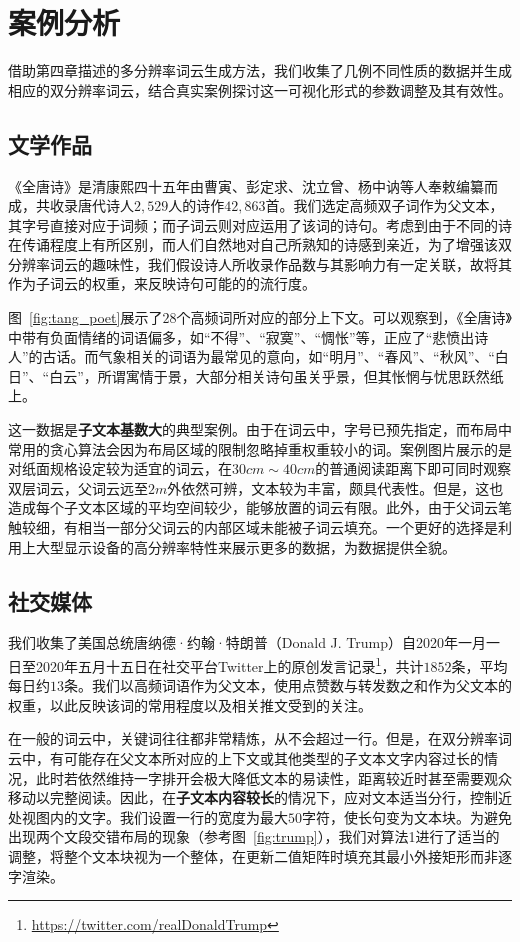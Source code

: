 \chapter{案例分析}
借助第四章描述的多分辨率词云生成方法，我们收集了几例不同性质的数据并生成相应的双分辨率词云，结合真实案例探讨这一可视化形式的参数调整及其有效性。

\section{文学作品}
《全唐诗》是清康熙四十五年由曹寅、彭定求、沈立曾、杨中讷等人奉敕编纂而成，共收录唐代诗人$2,529$人的诗作$42,863$首。我们选定高频双子词作为父文本，其字号直接对应于词频；而子词云则对应运用了该词的诗句。考虑到由于不同的诗在传诵程度上有所区别，而人们自然地对自己所熟知的诗感到亲近，为了增强该双分辨率词云的趣味性，我们假设诗人所收录作品数与其影响力有一定关联，故将其作为子词云的权重，来反映诗句可能的的流行度。

图~\ref{fig:tang_poet}展示了$28$个高频词所对应的部分上下文。可以观察到，《全唐诗》中带有负面情绪的词语偏多，如``不得''、``寂寞''、``惆怅''等，正应了``悲愤出诗人''的古话。而气象相关的词语为最常见的意向，如``明月''、``春风''、``秋风''、``白日''、``白云''，所谓寓情于景，大部分相关诗句虽关乎景，但其怅惘与忧思跃然纸上。

这一数据是\textbf{子文本基数大}的典型案例。由于在词云中，字号已预先指定，而布局中常用的贪心算法会因为布局区域的限制忽略掉重权重较小的词。案例图片展示的是对纸面规格设定较为适宜的词云，在$30cm\sim40cm$的普通阅读距离下即可同时观察双层词云，父词云远至$2m$外依然可辨，文本较为丰富，颇具代表性。但是，这也造成每个子文本区域的平均空间较少，能够放置的词云有限。此外，由于父词云笔触较细，有相当一部分父词云的内部区域未能被子词云填充。一个更好的选择是利用上大型显示设备的高分辨率特性来展示更多的数据，为数据提供全貌。


\section{社交媒体}
我们收集了美国总统唐纳德·约翰·特朗普（Donald J. Trump）自2020年一月一日至2020年五月十五日在社交平台Twitter上的原创发言记录\footnote{\url{https://twitter.com/realDonaldTrump}}，共计$1852$条，平均每日约$13$条。我们以高频词语作为父文本，使用点赞数与转发数之和作为父文本的权重，以此反映该词的常用程度以及相关推文受到的关注。

在一般的词云中，关键词往往都非常精炼，从不会超过一行。但是，在双分辨率词云中，有可能存在父文本所对应的上下文或其他类型的子文本文字内容过长的情况，此时若依然维持一字排开会极大降低文本的易读性，距离较近时甚至需要观众移动以完整阅读。因此，在\textbf{子文本内容较长}的情况下，应对文本适当分行，控制近处视图内的文字。我们设置一行的宽度为最大$50$字符，使长句变为文本块。为避免出现两个文段交错布局的现象（参考图~\ref{fig:trump}），我们对算法1进行了适当的调整，将整个文本块视为一个整体，在更新二值矩阵时填充其最小外接矩形而非逐字渲染。

